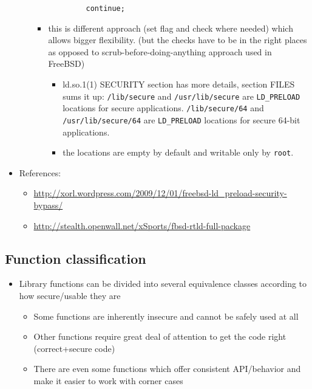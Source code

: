 \begin{itemize}
\begin{itemize}
\begin{verbatim}
          	continue;
\end{verbatim}
      \begin{itemize}
	\item this is different approach (set flag and check where needed)
	  which allows bigger flexibility. (but the checks have to be in
	  the right places as opposed to scrub-before-doing-anything
	  approach used in FreeBSD)
	  \begin{itemize}
	  \item ld.so.1(1) SECURITY section has more details, section FILES
	    sums it up:
    \texttt{/lib/secure} and \texttt{/usr/lib/secure} are
         \texttt{LD\_PRELOAD} locations for secure applications.
    \texttt{/lib/secure/64} and \texttt{/usr/lib/secure/64} are
         \texttt{LD\_PRELOAD} locations for secure 64-bit applications.
	 \item the locations are empty by default and writable only by
	 \texttt{root}.
	 \end{itemize}
     \end{itemize}
    \end{itemize}
  \item References:
    \begin{itemize}
    \item \url{http://xorl.wordpress.com/2009/12/01/freebsd-ld\_preload-security-bypass/}
    \item \url{http://stealth.openwall.net/xSports/fbsd-rtld-full-package}
    \end{itemize}
\end{itemize}


\subsection{Function classification}

\begin{itemize}
\item Library functions can be divided into several equivalence classes
  according to how secure/usable they are
    \begin{itemize}
    \item Some functions are inherently insecure and cannot be safely used
      at all
    \item Other functions require great deal of attention to get the code
      right (correct+secure code)
    \item There are even some functions which offer consistent API/behavior
      and make it easier to work with corner cases
    \end{itemize}
\end{itemize}


